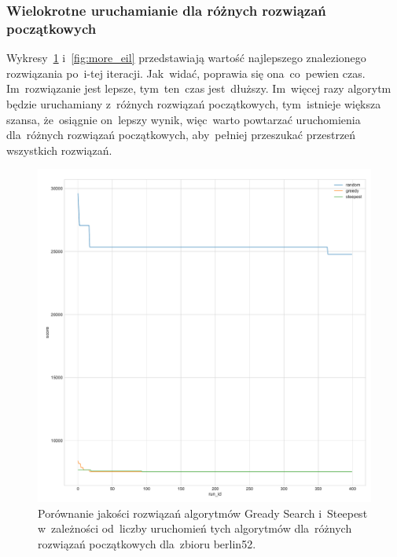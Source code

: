 \subsubsection{Wielokrotne uruchamianie dla różnych rozwiązań początkowych}

Wykresy~\ref{fig:more_berlin} i~\ref{fig:more_eil} przedstawiają wartość najlepszego znalezionego rozwiązania po~i-tej iteracji. Jak~widać, poprawia się ona~co~pewien czas. Im~rozwiązanie jest lepsze, tym~ten~czas jest~dłuższy. Im~więcej razy algorytm będzie uruchamiany z~różnych rozwiązań początkowych, tym~istnieje większa szansa, że~osiągnie on~lepszy wynik, więc~warto powtarzać uruchomienia dla~różnych rozwiązań początkowych, aby~pełniej przeszukać przestrzeń wszystkich rozwiązań.

\begin{figure}[H]
\begin{center}
\includegraphics[width=1.0\textwidth]{graphs/multi_start_scoreberlin52.pdf}
\end{center}
\caption{Porównanie jakości rozwiązań algorytmów Gready Search i~Steepest w~zależności od~liczby uruchomień tych algorytmów dla~różnych rozwiązań początkowych dla~zbioru berlin52.}
\label{fig:more_berlin}
\end{figure}

